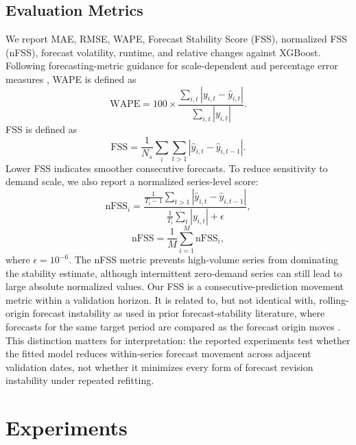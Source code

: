 \documentclass[10pt,conference]{IEEEtran}
\begin{document}
\subsection{Evaluation Metrics}
We report MAE, RMSE, WAPE, Forecast Stability Score (FSS), normalized FSS (nFSS), forecast volatility, runtime, and relative changes against XGBoost. Following forecasting-metric guidance for scale-dependent and percentage error measures \cite{hyndman2006accuracyMetrics,petropoulos2022forecasting}, WAPE is defined as
\begin{equation}
\mathrm{WAPE} = 100 \times \frac{\sum_{i,t}|y_{i,t}-\hat{y}_{i,t}|}{\sum_{i,t}|y_{i,t}|}.
\end{equation}
FSS is defined as
\begin{equation}
\mathrm{FSS} = \frac{1}{N_s}\sum_i\sum_{t>1}\left|\hat{y}_{i,t} - \hat{y}_{i,t-1}\right|.
\end{equation}
Lower FSS indicates smoother consecutive forecasts. To reduce sensitivity to demand scale, we also report a normalized series-level score:
\begin{equation}
\mathrm{nFSS}_i = \frac{\frac{1}{T_i-1}\sum_{t>1}\left|\hat{y}_{i,t}-\hat{y}_{i,t-1}\right|}{\frac{1}{T_i}\sum_t |y_{i,t}| + \epsilon},
\end{equation}
\begin{equation}
\mathrm{nFSS} = \frac{1}{M}\sum_{i=1}^M \mathrm{nFSS}_i,
\end{equation}
where $\epsilon=10^{-6}$. The nFSS metric prevents high-volume series from dominating the stability estimate, although intermittent zero-demand series can still lead to large absolute normalized values.
Our FSS is a consecutive-prediction movement metric within a validation horizon. It is related to, but not identical with, rolling-origin forecast instability as used in prior forecast-stability literature, where forecasts for the same target period are compared as the forecast origin moves \cite{vanBelle2023stability,godahewa2025forecastStability}. This distinction matters for interpretation: the reported experiments test whether the fitted model reduces within-series forecast movement across adjacent validation dates, not whether it minimizes every form of forecast revision instability under repeated refitting.

\section{Experiments}
\end{document}
